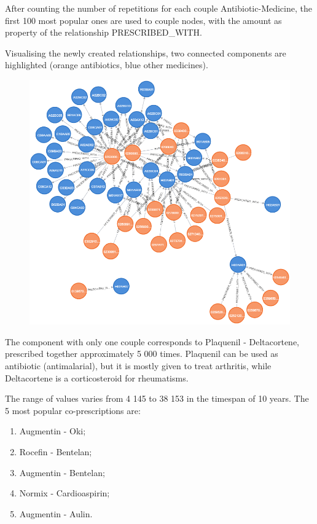 After counting the number of repetitions for each couple Antibiotic-Medicine, the first 100 most popular ones are used to couple nodes, with the amount as property of the relationship PRESCRIBED\_WITH.

Visualising the newly created relationships, two connected components are highlighted (orange antibiotics, blue other medicines).

\begin{figure}[h]
	\centering
	\includegraphics[scale=0.4]{./images/couples-graph.png}
\end{figure}

The component with only one couple corresponds to Plaquenil - Deltacortene, prescribed together approximately 5 000 times. Plaquenil can be used as antibiotic (antimalarial), but it is mostly given to treat arthritis, while Deltacortene is a corticosteroid for rheumatisms. 

The range of values varies from 4 145 to 38 153 in the timespan of 10 years. The 5 most popular co-prescriptions are:
\begin{enumerate}
	\item Augmentin - Oki;
	\item Rocefin - Bentelan;
	\item Augmentin - Bentelan;
	\item Normix - Cardioaspirin;
	\item Augmentin - Aulin.
\end{enumerate}


